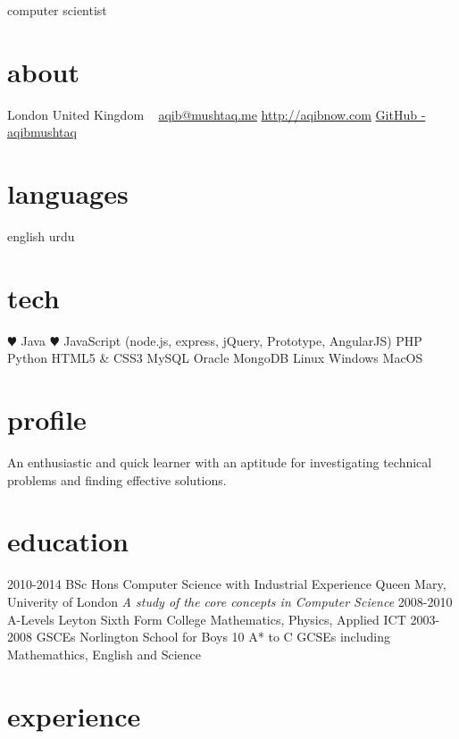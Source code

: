 \documentclass[]{friggeri-cv}
\begin{document}
       {computer scientist}

\begin{aside}
  \section{about}
    London
    United Kingdom
    ~
    \href{mailto:aqib@mushtaq.me}{aqib@mushtaq.me}
    \href{http://aqibnow.com}{http://aqibnow.com}
    \href{https://github.com/aqibmushtaq}{GitHub - aqibmushtaq}
  \section{languages}
    english
    urdu
  \section{tech}
    {\color{red} $\varheartsuit$} Java
    {\color{red} $\varheartsuit$} JavaScript
    (node.js, express, jQuery, Prototype, AngularJS)
    PHP
    Python
    HTML5 \& CSS3
    MySQL
    Oracle
    MongoDB
    Linux
    Windows
    MacOS
\end{aside}

\section{profile}

An enthusiastic and quick learner with an aptitude for investigating technical problems and finding effective solutions.

\section{education}

\begin{entrylist}
  \entry
    {2010-2014}
    {BSc Hons {\normalfont Computer Science with Industrial Experience}}
    {Queen Mary, Univerity of London}
    {\emph{A study of the core concepts in Computer Science}}
  \entry
    {2008-2010}
    {A-Levels}
    {Leyton Sixth Form College}
    {Mathematics, Physics, Applied ICT}
  \entry
    {2003-2008}
    {GSCEs}
    {Norlington School for Boys}
    {10 A* to C GCSEs including Mathemathics, English and Science}
\end{entrylist}

\section{experience}
\end{document}

